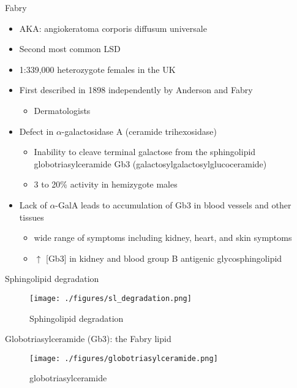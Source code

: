 \documentclass[presentation, smaller]{beamer}
\begin{document}
\begin{frame}[label={sec:orgheadline1}]{Fabry}
\begin{itemize}
\item AKA: angiokeratoma corporis diffusum universale
\item Second most common LSD
\item 1:339,000 heterozygote females in the UK
\item First described in 1898 independently by Anderson and Fabry
\begin{itemize}
\item Dermatologists
\end{itemize}
\item Defect in \(\alpha\)-galactosidase A (ceramide trihexosidase)
\begin{itemize}
\item Inability to cleave terminal galactose from the sphingolipid globotriasylceramide Gb3 (galactosylgalactosylglucoceramide)
\item 3 to 20\% activity in hemizygote males
\end{itemize}
\item Lack of \(\alpha\)-GalA leads to accumulation of Gb3 in blood vessels and other tissues
\begin{itemize}
\item wide range of symptoms including kidney, heart, and skin symptoms
\item \(\uparrow\) [Gb3] in kidney and blood group B antigenic glycosphingolipid
\end{itemize}
\end{itemize}
\end{frame}

\begin{frame}[label={sec:orgheadline2}]{Sphingolipid degradation}
\begin{figure}[htb]
\centering
\texttt{[image: ./figures/sl\_degradation.png]}
\caption[deg]{\label{fig:sld}
Sphingolipid degradation}
\end{figure}
\end{frame}


\begin{frame}[label={sec:orgheadline3}]{Globotriasylceramide (Gb3): the Fabry lipid}
\begin{figure}[htb]
\centering
\texttt{[image: ./figures/globotriasylceramide.png]}
\caption[gluc]{\label{fig:galac}
globotriasylceramide}
\end{figure}
\end{frame}
\end{document}

